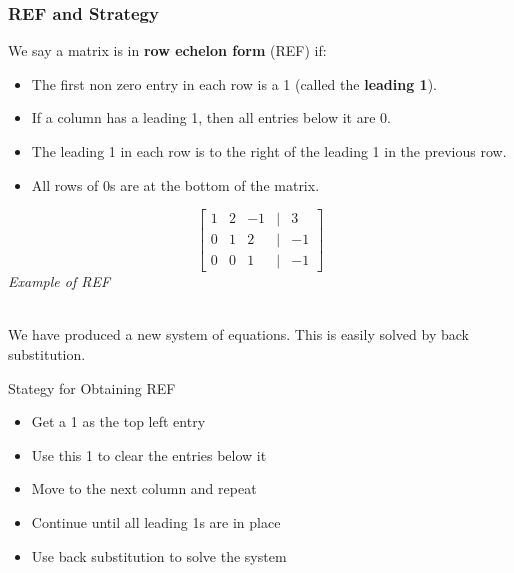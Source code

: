 \documentclass[a4paper, 9pt]{extarticle}
\begin{document}
\subsubsection{REF and Strategy}
\begin{minipage}{0.8\textwidth}
  We say a matrix is in \textbf{row echelon form} (REF) if:
  \begin{itemize}
    \item The first non zero entry in each row is a 1 (called the \textbf{leading 1}).
    \item If a column has a leading 1, then all entries below it are 0.
    \item The leading 1 in each row is to the right of the leading 1 in the previous row.
    \item All rows of 0s are at the bottom of the matrix.
  \end{itemize}
\end{minipage}
\begin{minipage}{0.2\textwidth}
  \begin{center}
    $$
      \begin{bmatrix}
        1 & 2 & -1 & | & 3  \\
        0 & 1 & 2  & | & -1 \\
        0 & 0 & 1  & | & -1
      \end{bmatrix}
    $$
    \emph{Example of REF}
  \end{center}


\end{minipage} \\[2ex]
We have produced a new system of equations. This is easily solved by back substitution.

\begin{conceptbox}{Stategy for Obtaining REF}{}
  \begin{itemize}
    \item Get a 1 as the top left entry
    \item Use this 1 to clear the entries below it
    \item Move to the next column and repeat
    \item Continue until all leading 1s are in place
    \item Use back substitution to solve the system
  \end{itemize}
\end{conceptbox}
\end{document}
